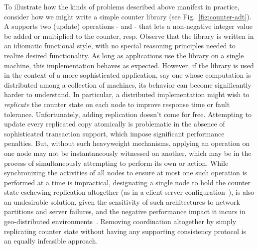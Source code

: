 To illustrate how the kinds of problems described above manifest in
practice, consider how we might write a simple counter library (see
Fig.~\ref{fig:counter-adt}).  A  supports two (update)
operations -  and  - that lets a non-negative integer
value be added or multiplied to the counter, resp.  Observe that the
library is written in an idiomatic functional style, with no special
reasoning principles needed to realize desired functionality.  As long
as applications use the library on a single machine, this
implementation behaves as expected.  However, if the library is used
in the context of a more sophisticated application, say one whose
computation is distributed among a collection of machines, its
behavior can become significantly harder to understand.  In
particular, a distributed implementation might wish to
\emph{replicate} the counter state on each node to improve response
time or fault tolerance.  Unfortunately, adding replication doesn't
come for free.  Attempting to update every replicated copy atomically
is problematic in the absence of sophisticated transaction support,
which impose significant performance penalties.  But, without such
heavyweight mechanisms, applying an  operation on one node may
not be instantaneously witnessed on another, which may be in the
process of simultaneously attempting to perform its own  or
 action.  While synchronizing the activities of all nodes to
ensure at most one such operation is performed at a time is
impractical, designating a single node to hold the counter state
eschewing replication altogether (as in a client-server
configuration~\cite{Armstrong}), is also an undesirable solution,
given the sensitivity of such architectures to network partitions and
server failures, and the negative performance impact it incurs in
geo-distributed environments~\cite{Walter}.  Removing coordination
altogether by simply replicating counter state without having any
supporting consistency protocol is an equally infeasible approach.

